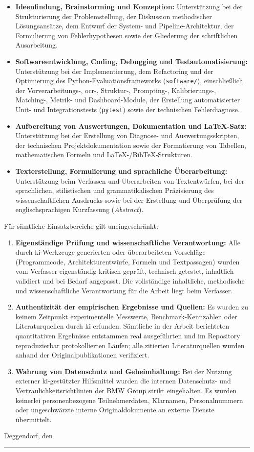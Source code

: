 \begin{itemize}
  \item \textbf{Ideenfindung, Brainstorming und Konzeption:} Unterstützung bei der Strukturierung der Problemstellung, der Diskussion methodischer Lösungsansätze, dem Entwurf der System- und Pipeline-Architektur, der Formulierung von Fehlerhypothesen sowie der Gliederung der schriftlichen Ausarbeitung.
  \item \textbf{Softwareentwicklung, Coding, Debugging und Testautomatisierung:} Unterstützung bei der Implementierung, dem Refactoring und der Optimierung des Python-Evaluationsframeworks (\texttt{software/}), einschließlich der Vorverarbeitungs-, \acs{ocr}-, Struktur-, Prompting-, Kalibrierungs-, Matching-, Metrik- und Dashboard-Module, der Erstellung automatisierter Unit- und Integrationstests (\texttt{pytest}) sowie der technischen Fehlerdiagnose.
  \item \textbf{Aufbereitung von Auswertungen, Dokumentation und \LaTeX-Satz:} Unterstützung bei der Erstellung von Diagnose- und Auswertungsskripten, der technischen Projektdokumentation sowie der Formatierung von Tabellen, mathematischen Formeln und \LaTeX-/BibTeX-Strukturen.
  \item \textbf{Texterstellung, Formulierung und sprachliche Überarbeitung:} Unterstützung beim Verfassen und Überarbeiten von Textentwürfen, bei der sprachlichen, stilistischen und grammatikalischen Präzisierung des wissenschaftlichen Ausdrucks sowie bei der Erstellung und Überprüfung der englischsprachigen Kurzfassung (\emph{Abstract}).
\end{itemize}

Für sämtliche Einsatzbereiche gilt uneingeschränkt:
\begin{enumerate}
  \item \textbf{Eigenständige Prüfung und wissenschaftliche Verantwortung:} Alle durch \acs{ki}-Werkzeuge generierten oder überarbeiteten Vorschläge (Programmcode, Architekturentwürfe, Formeln und Textpassagen) wurden vom Verfasser eigenständig kritisch geprüft, technisch getestet, inhaltlich validiert und bei Bedarf angepasst. Die vollständige inhaltliche, methodische und wissenschaftliche Verantwortung für die Arbeit liegt beim Verfasser.
  \item \textbf{Authentizität der empirischen Ergebnisse und Quellen:} Es wurden zu keinem Zeitpunkt experimentelle Messwerte, Benchmark-Kennzahlen oder Literaturquellen durch \acs{ki} erfunden. Sämtliche in der Arbeit berichteten quantitativen Ergebnisse entstammen real ausgeführten und im Repository reproduzierbar protokollierten Läufen; alle zitierten Literaturquellen wurden anhand der Originalpublikationen verifiziert.
  \item \textbf{Wahrung von Datenschutz und Geheimhaltung:} Bei der Nutzung externer \acs{ki}-gestützter Hilfsmittel wurden die internen Datenschutz- und Vertraulichkeitsrichtlinien der BMW Group strikt eingehalten. Es wurden keinerlei personenbezogene Teilnehmerdaten, Klarnamen, Personalnummern oder ungeschwärzte interne Originaldokumente an externe Dienste übermittelt.
\end{enumerate}

\vspace{2cm}

\noindent
Deggendorf, den \submissiondate

\vspace{1.8cm}

\noindent
\rule{7cm}{0.4pt}\\
\student
